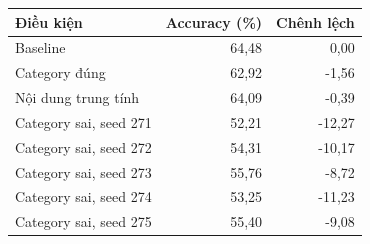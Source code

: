\begin{tabular}{@{}lrr@{}}
\toprule
Điều kiện & Accuracy (\%) & Chênh lệch \\
\midrule
Baseline & 64,48 & 0,00 \\
Category đúng & 62,92 & -1,56 \\
Nội dung trung tính & 64,09 & -0,39 \\
Category sai, seed 271 & 52,21 & -12,27 \\
Category sai, seed 272 & 54,31 & -10,17 \\
Category sai, seed 273 & 55,76 & -8,72 \\
Category sai, seed 274 & 53,25 & -11,23 \\
Category sai, seed 275 & 55,40 & -9,08 \\
\bottomrule
\end{tabular}
